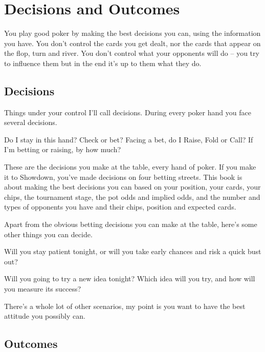 \chapter{Decisions and Outcomes}


You play good poker by making the best decisions you can,
using the information you have. You don't control the cards
you get dealt, nor the cards that appear on the flop, turn and river.
You don't control what your opponents will do -- you try to influence
them but in the end it's up to them what they do.


\section{Decisions}

Things under your control I'll call decisions. During
every poker hand you face several decisions.

Do I stay in this hand? Check or bet? Facing a bet, do I
Raise, Fold or Call? If I'm betting or raising, by how much?

These are the decisions you make at the table, every hand
of poker. If you make it to Showdown, you've made decisions on four
betting streets. This book is about making the best
decisions you can based on your position, your cards, your chips,
the tournament stage, the pot odds and implied odds, and the number
and types of opponents you have and their chips, position and
expected cards.

Apart from the obvious betting decisions you can make at the table,
here's some other things you can decide.

Will you stay patient tonight, or will you take early chances and risk
a quick bust out?

Will you going to try a new idea tonight? Which idea will
you try, and how will you measure its success?

There's a whole lot of other scenarios, my
point is you want to have the best attitude
you possibly can.

\section{Outcomes}

